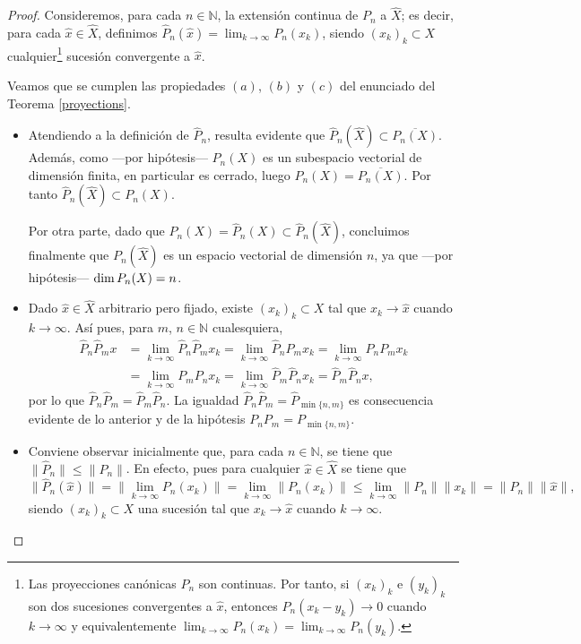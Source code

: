 		\begin{proof}			
			Consideremos, para cada $n\in\mathbb{N}$, la extensión continua de $P_n$ a $\hat{X}$; es decir, para cada $\hat{x}\in\hat{X}$, definimos $\hat{P}_n(\hat{x})= \lim_{k\to\infty}P_n(x_k)$, siendo $(x_k)_k\subset X$ cualquier\footnote{Las proyecciones canónicas $P_n$ son continuas. Por tanto, si $(x_k)_k$ e $(y_k)_k$ son dos sucesiones convergentes a $\hat{x}$, entonces $\hat{P}_n(x_k-y_k)\to 0$ cuando $k\to\infty$ y equivalentemente $\lim_{k\to\infty}P_n(x_k)=\lim_{k\to\infty}P_n(y_k)$.} sucesión convergente a $\hat{x}$.
			
			Veamos que se cumplen las propiedades $(a)$, $(b)$ y $(c)$ del enunciado del Teorema \ref{proyections}.
			
			\begin{itemize}
				\item[$(a)$]{Atendiendo a la definición de $\hat{P}_n$, resulta evidente que 
					$\hat{P}_n(\hat{X})\subset\overline{P_n(X)}$. Además, como ---por hipótesis--- $P_n(X)$ es un subespacio vectorial de dimensión finita, en particular es cerrado, luego $P_n(X)=\overline{P_n(X)}$. Por tanto $\hat{P}_n(\hat{X})\subset P_n(X)$.
					
					Por otra parte, dado que $P_n(X)=\hat{P}_n(X)\subset\hat{P}_n(\hat{X})$, concluimos finalmente que $P_n(\hat{X})$ es un espacio vectorial de dimensión $n$, ya que ---por hipótesis--- ${\rm dim}\,P_n(X)=n$.}
				
				\item[$(b)$]{Dado $\hat{x}\in \hat{X}$ arbitrario pero fijado, existe $(x_k)_k\subset X$ tal que $x_k\to\hat{x}$ cuando $k\to\infty$. Así pues, para $m$, $n\in\mathbb{N}$ cualesquiera,
					\begin{align*}
						\hat{P}_n\hat{P}_mx & = \lim_{k \to\infty}{\hat{P}_n\hat{P}_mx_k} = \lim_{k \rightarrow\infty}{\hat{P}_nP_mx_k} = \lim_{k \rightarrow\infty}{P_nP_mx_k}\\ & =  \lim_{k \rightarrow\infty}{P_mP_nx_k} = \lim_{k \rightarrow\infty}{\hat{P}_m\hat{P}_nx_k} = \hat{P}_m\hat{P}_nx,
					\end{align*}
					por lo que $\hat{P}_n\hat{P}_m=\hat{P}_m\hat{P}_n$. La igualdad $\hat{P}_n\hat{P}_m=\hat{P}_{\min\{n,m\}}$} es consecuencia evidente de lo anterior y de la hipótesis $P_nP_m=P_{\min\{n,m\}}$.
				\item[$(c)$]{Conviene observar inicialmente que, para cada $n\in\mathbb{N}$, se tiene que $\|\hat{P}_n\|\leq\|P_n\|$. En efecto, pues para cualquier $\hat{x}\in\hat{X}$ se tiene que
					\[\|\hat{P}_n(\hat{x})\| = \|\lim_{k \to \infty}P_n(x_k)\| = \lim_{k\to \infty}\|P_n(x_k)\| \leq \lim_{k \to \infty}\|P_n\|\|x_k\| = \|P_n\|\|\hat{x}\|,\]
					siendo $(x_k)_k\subset X$ una sucesión tal que $x_k\to \hat{x}$ cuando $k\to\infty$.
					
}
\end{itemize}
\end{proof}
